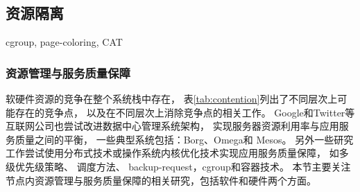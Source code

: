 \subsection{资源隔离}
cgroup, page-coloring, CAT



\subsubsection{资源管理与服务质量保障}

软硬件资源的竞争在整个系统栈中存在，
表\ref{tab:contention}列出了不同层次上可能存在的竞争点，
以及在不同层次上消除竞争点的相关工作。
Google和Twitter等互联网公司也尝试改进数据中心管理系统架构，
实现服务器资源利用率与应用服务质量之间的平衡，
一些典型系统包括：Borg\cite{borg:2015}、Omega\cite{Schwarzkopf_omega_2013}和
Mesos\cite{Hindman:2011:Mesos}。
另外一些研究工作尝试使用分布式技术或操作系统内核优化技术实现应用服务质量保障，
如多级优先级策略\cite{Reiss_googletrace_2012}、
调度方法\cite{delimitrou_paragon:_2013, delimitrou_quasar:_2014, mars_heterogeneity_2011,
kozyrakis_reconciling_2014, Novakovi:ATC2013}、
backup-request\cite{dean_tail_2013}，cgroup\cite{cgroup}和容器技术\cite{lxc}。 
本节主要关注节点内资源管理与服务质量保障的相关研究，包括软件和硬件两个方面。

